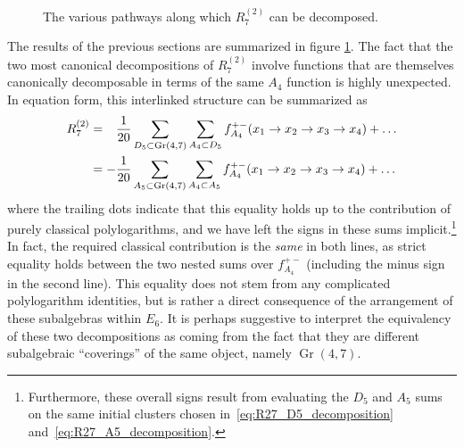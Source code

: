 \documentclass[12pt]{article}
\DeclareMathOperator{\Gr}{Gr}
\begin{document}
\begin{figure}[t] \centering
  \caption{The various pathways along which $R^{(2)}_7$ can be decomposed.}
\label{fig:R27_decompositions}
\end{figure}

The results of the previous sections are summarized in figure \ref{fig:R27_decompositions}. The fact that the two most canonical decompositions of $R^{(2)}_7$ involve functions that are themselves canonically decomposable in terms of the same $A_4$ function is highly unexpected. In equation form, this interlinked structure can be summarized as
\begin{align}
	R^{(2)}_7 &=  {\color{white} - } \frac{1}{20} \sum_{D_5\subset \Gr(4,7)} \sum_{A_4\subset D_5} f_{A_4}^{+-}(x_1\to x_2 \to x_3 \to x_4) + \dots \label{eq:r27_a4_d5_e6_decomposition} \\
	& = - \frac{1}{20}  \sum_{A_5\subset \Gr(4,7)} \sum_{A_4\subset A_5} f_{A_4}^{+-}(x_1\to x_2 \to x_3 \to x_4) + \dots \label{eq:r27_a4_a5_e6_decomposition}
\end{align}
where the trailing dots indicate that this equality holds up to the contribution of purely classical polylogarithms, and we have left the signs in these sums implicit.\footnote{Furthermore, these overall signs result from evaluating the $D_5$ and $A_5$ sums on  the same initial clusters chosen in~\eqref{eq:R27_D5_decomposition} and~\eqref{eq:R27_A5_decomposition}.} In fact, the required classical contribution is the \emph{same} in both lines, as strict equality holds between the two nested sums over $f_{A_4}^{+-}$ (including the minus sign in the second line). This equality does not stem from any complicated polylogarithm identities, but is rather a direct consequence of the arrangement of these subalgebras within $E_6$. It is perhaps suggestive to interpret the equivalency of these two decompositions as coming from the fact that they are different subalgebraic ``coverings'' of the same object, namely $\Gr(4,7)$.
\end{document}
